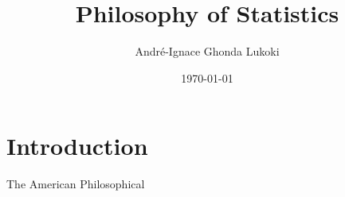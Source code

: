 \documentclass{article}
\title{Philosophy of Statistics}
\author{André-Ignace Ghonda Lukoki}
\date{\today}
\begin{document}
\maketitle
    
\section{Introduction}
The American Philosophical
\end{document}
